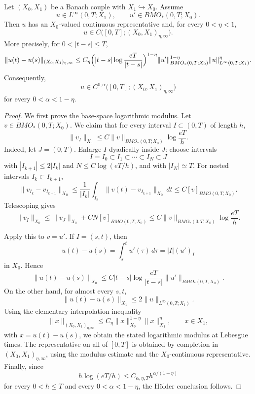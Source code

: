 \documentclass[smallextended,envcountsect,envcountsame]{svjour3}
\begin{document}
	\begin{theorem}\label{thm:bmo-log-trace}
	Let \((X_0,X_1)\) be a Banach couple with \(X_1\hookrightarrow X_0\).  Assume
	\[
	u\in L^\infty(0,T;X_1),
	\qquad
	u'\in BMO_*(0,T;X_0).
	\]
	Then \(u\) has an \(X_0\)-valued continuous representative and, for every \(0<\eta<1\),
	\[
	u\in C\bigl([0,T];(X_0,X_1)_{\eta,\infty}\bigr).
	\]
	More precisely, for \(0<|t-s|\le T\),
	\[
	\|u(t)-u(s)\|_{(X_0,X_1)_{\eta,\infty}}
	\le
	C_\eta
	\Bigl(|t-s|\log\frac{eT}{|t-s|}\Bigr)^{1-\eta}
	\|u'\|_{BMO_*(0,T;X_0)}^{1-\eta}
	\|u\|_{L^\infty(0,T;X_1)}^\eta.
	\]
	Consequently,
	\[
	u\in C^{0,\alpha}\bigl([0,T];(X_0,X_1)_{\eta,\infty}\bigr)
	\]
	for every \(0<\alpha<1-\eta\).
	\end{theorem}

	\begin{proof}
	We first prove the base-space logarithmic modulus.  Let \(v\in BMO_*(0,T;X_0)\).  We claim that for every interval \(I\subset(0,T)\) of length \(h\),
	\[
	\|v_I\|_{X_0}
	\le
	C\|v\|_{BMO_*(0,T;X_0)}\log\frac{eT}{h}.
	\]
	Indeed, let \(J=(0,T)\).  Enlarge \(I\) dyadically inside \(J\): choose intervals
	\[
	I=I_0\subset I_1\subset\cdots\subset I_N\subset J
	\]
	with \(|I_{k+1}|\le 2|I_k|\) and \(N\le C\log(eT/h)\), and with \(|I_N|\simeq T\).  For nested intervals \(I_k\subset I_{k+1}\),
	\[
	\|v_{I_k}-v_{I_{k+1}}\|_{X_0}
	\le
	\frac1{|I_k|}\int_{I_k}\|v(t)-v_{I_{k+1}}\|_{X_0}\,dt
	\le
	C[v]_{BMO(0,T;X_0)}.
	\]
	Telescoping gives
	\[
	\|v_I\|_{X_0}
	\le
	\|v_J\|_{X_0}+C N[v]_{BMO(0,T;X_0)}
	\le
	C\|v\|_{BMO_*(0,T;X_0)}\log\frac{eT}{h}.
	\]

	Apply this to \(v=u'\).  If \(I=(s,t)\), then
	\[
	u(t)-u(s)=\int_s^t u'(\tau)\,d\tau=|I|(u')_I
	\]
	in \(X_0\).  Hence
	\[
	\|u(t)-u(s)\|_{X_0}
	\le
	C |t-s|\log\frac{eT}{|t-s|}
	\|u'\|_{BMO_*(0,T;X_0)}.
	\]
	On the other hand, for almost every \(s,t\),
	\[
	\|u(t)-u(s)\|_{X_1}
	\le 2\|u\|_{L^\infty(0,T;X_1)}.
	\]
	Using the elementary interpolation inequality
	\[
	\|x\|_{(X_0,X_1)_{\eta,\infty}}
	\le
	C_\eta\|x\|_{X_0}^{1-\eta}\|x\|_{X_1}^{\eta},
	\qquad x\in X_1,
	\]
	with \(x=u(t)-u(s)\), we obtain the stated logarithmic modulus at Lebesgue times.  The representative on all of \([0,T]\) is obtained by completion in \((X_0,X_1)_{\eta,\infty}\), using the modulus estimate and the \(X_0\)-continuous representative.  Finally, since
	\[
	h\log(eT/h)\le C_{\alpha,\eta,T}h^{\alpha/(1-\eta)}
	\]
	for every \(0<h\le T\) and every \(0<\alpha<1-\eta\), the H\"older conclusion follows.
	\end{proof}
\end{document}
